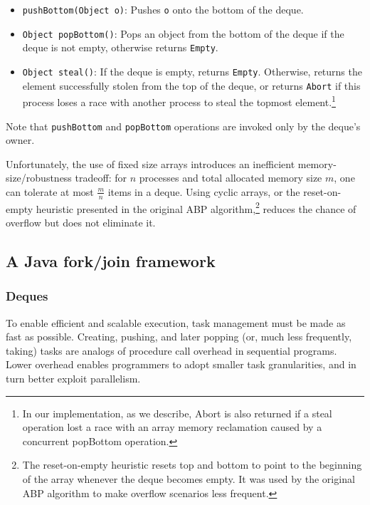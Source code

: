 \begin{itemize}
\item \lstinline!pushBottom(Object o)!: Pushes \lstinline!o! onto the
  bottom of the deque.
\item \lstinline!Object popBottom()!: Pops an object from the bottom
  of the deque if the deque is not empty, otherwise returns
  \lstinline!Empty!.
\item \lstinline!Object steal()!: If the deque is empty, returns
  \lstinline!Empty!. Otherwise, returns the element successfully
  stolen from the top of the deque, or returns \lstinline!Abort! if
  this process loses a race with another process to steal the topmost
  element.\footnote{In our implementation, as we describe, Abort is
    also returned if a steal operation lost a race with an array
    memory reclamation caused by a concurrent popBottom operation.}
\end{itemize}

Note that \lstinline!pushBottom! and \lstinline!popBottom! operations
are invoked only by the deque's owner.

Unfortunately, the use of fixed size arrays introduces an inefficient
memory-size/robustness tradeoff: for $n$ processes and total allocated
memory size $m$, one can tolerate at most $\frac{m}{n}$ items in a
deque. Using cyclic arrays, or the reset-on- empty heuristic presented
in the original ABP algorithm,\footnote{The reset-on-empty heuristic
  resets top and bottom to point to the beginning of the array
  whenever the deque becomes empty. It was used by the original ABP
  algorithm to make overflow scenarios less frequent.} reduces the
chance of overflow but does not eliminate it.

\subsection{A Java fork/join framework \cite{Lea2000}}

\subsubsection{Deques}

To enable efficient and scalable execution, task management must be
made as fast as possible. Creating, pushing, and later popping (or,
much less frequently, taking) tasks are analogs of procedure call
overhead in sequential programs. Lower overhead enables programmers to
adopt smaller task granularities, and in turn better exploit
parallelism.

